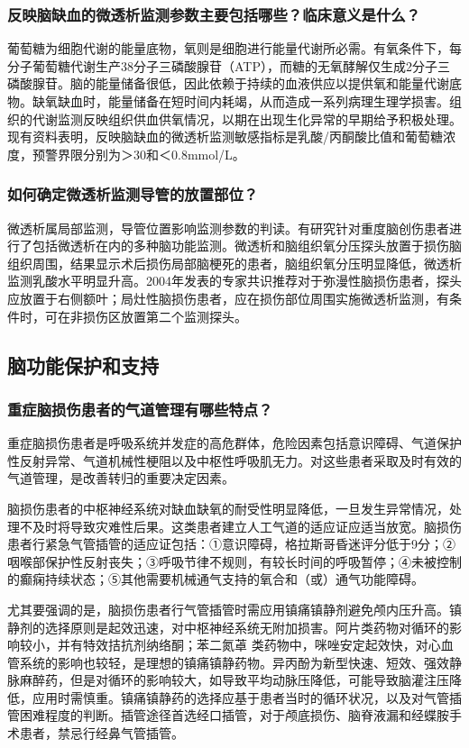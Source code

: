 \subsubsection{反映脑缺血的微透析监测参数主要包括哪些？临床意义是什么？}

葡萄糖为细胞代谢的能量底物，氧则是细胞进行能量代谢所必需。有氧条件下，每分子葡萄糖代谢生产38分子三磷酸腺苷（ATP），而糖的无氧酵解仅生成2分子三磷酸腺苷。脑的能量储备很低，因此依赖于持续的血液供应以提供氧和能量代谢底物。缺氧缺血时，能量储备在短时间内耗竭，从而造成一系列病理生理学损害。组织的代谢监测反映组织供血供氧情况，以期在出现生化异常的早期给予积极处理。现有资料表明，反映脑缺血的微透析监测敏感指标是乳酸/丙酮酸比值和葡萄糖浓度，预警界限分别为＞30和＜0.8mmol/L。

\subsubsection{如何确定微透析监测导管的放置部位？}

微透析属局部监测，导管位置影响监测参数的判读。有研究针对重度脑创伤患者进行了包括微透析在内的多种脑功能监测。微透析和脑组织氧分压探头放置于损伤脑组织周围，结果显示术后损伤局部脑梗死的患者，脑组织氧分压明显降低，微透析监测乳酸水平明显升高。2004年发表的专家共识推荐对于弥漫性脑损伤患者，探头应放置于右侧额叶；局灶性脑损伤患者，应在损伤部位周围实施微透析监测，有条件时，可在非损伤区放置第二个监测探头。

\subsection{脑功能保护和支持}

\subsubsection{重症脑损伤患者的气道管理有哪些特点？}

重症脑损伤患者是呼吸系统并发症的高危群体，危险因素包括意识障碍、气道保护性反射异常、气道机械性梗阻以及中枢性呼吸肌无力。对这些患者采取及时有效的气道管理，是改善转归的重要决定因素。

脑损伤患者的中枢神经系统对缺血缺氧的耐受性明显降低，一旦发生异常情况，处理不及时将导致灾难性后果。这类患者建立人工气道的适应证应适当放宽。脑损伤患者行紧急气管插管的适应证包括：①意识障碍，格拉斯哥昏迷评分低于9分；②咽喉部保护性反射丧失；③呼吸节律不规则，有较长时间的呼吸暂停；④未被控制的癫痫持续状态；⑤其他需要机械通气支持的氧合和（或）通气功能障碍。

尤其要强调的是，脑损伤患者行气管插管时需应用镇痛镇静剂避免颅内压升高。镇静剂的选择原则是起效迅速，对中枢神经系统无附加损害。阿片类药物对循环的影响较小，并有特效拮抗剂纳络酮；苯二氮䓬
类药物中，咪唑安定起效快，对心血管系统的影响也较轻，是理想的镇痛镇静药物。异丙酚为新型快速、短效、强效静脉麻醉药，但是对循环的影响较大，如导致平均动脉压降低，可能导致脑灌注压降低，应用时需慎重。镇痛镇静药的选择应基于患者当时的循环状况，以及对气管插管困难程度的判断。插管途径首选经口插管，对于颅底损伤、脑脊液漏和经蝶胺手术患者，禁忌行经鼻气管插管。

